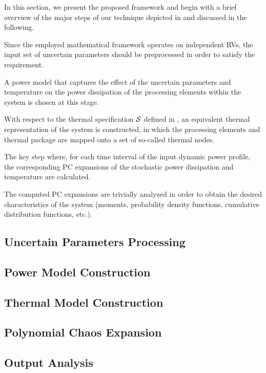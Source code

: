 In this section, we present the proposed framework and begin with a brief overview of the major steps of our technique depicted in  and discussed in the following.

 Since the employed mathematical framework operates on independent RVs, the input set of uncertain parameters should be preprocessed in order to satisfy the requirement.

 A power model that captures the effect of the uncertain parameters and temperature on the power dissipation of the processing elements within the system is chosen at this stage.

 With respect to the thermal specification $\mathcal{S}$ defined in , an equivalent thermal representation of the system is constructed, in which the processing elements and thermal package are mapped onto a set of so-called thermal nodes.

 The key step where, for each time interval of the input dynamic power profile, the corresponding PC expansions of the stochastic power dissipation and temperature are calculated.

 The computed PC expansions are trivially analyzed in order to obtain the desired characteristics of the system (moments, probability density functions, cumulative distribution functions, etc.).

\subsection{Uncertain Parameters Processing} 


\subsection{Power Model Construction} 


\subsection{Thermal Model Construction} 


\subsection{Polynomial Chaos Expansion} 


\subsection{Output Analysis} 

